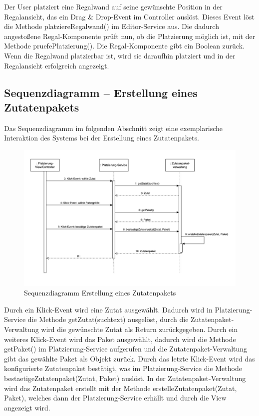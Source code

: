 Der User platziert eine Regalwand auf seine gewünschte Position in der Regalansicht, das ein Drag \& Drop-Event im
Controller auslöst. Dieses Event löst die Methode platziereRegalwand() im Editor-Service aus. Die dadurch angestoßene
Regal-Komponente prüft nun, ob die Platzierung möglich ist, mit der Methode pruefePlatzierung(). Die Regal-Komponente
gibt ein Boolean zurück. Wenn die Regalwand platzierbar ist, wird sie daraufhin platziert und in der Regalansicht
erfolgreich angezeigt.

\subsection{Sequenzdiagramm – Erstellung eines Zutatenpakets}
Das Sequenzdiagramm im folgenden Abschnitt zeigt eine exemplarische Interaktion des Systems bei der Erstellung eines Zutatenpakets.

\begin{figure}[H]
    \centering
    \includegraphics[width=1\textwidth]{Bilder/Kapitel/Laufzeitsicht/Sequenzdiagramm_Zutatenpaket-Erstellung}
    \caption{Sequenzdiagramm Erstellung eines Zutatenpakets}
    \label{fig:Sequenzdiagramm_Erstellung_Zutatenpaket}
\end{figure}

Durch ein Klick-Event wird eine Zutat ausgewählt. Dadurch wird in Platzierung-Service die Methode getZutat(suchtext)
ausgelöst, durch die Zutatenpaket-Verwaltung wird die gewünschte Zutat als Return zurückgegeben. Durch ein weiteres
Klick-Event wird das Paket ausgewählt, dadurch wird die Methode getPaket() im Platzierung-Service aufgerufen und die
Zutatenpaket-Verwaltung gibt das gewählte Paket als Objekt zurück. Durch das letzte Klick-Event wird das konfigurierte
Zutatenpaket bestätigt, was im Platzierung-Service die Methode bestaetigeZutatenpaket(Zutat, Paket) auslöst. In der
Zutatenpaket-Verwaltung wird das Zutatenpaket erstellt mit der Methode erstelleZutatenpaket(Zutat, Paket), welches
dann der Platzierung-Service erhällt und durch die View angezeigt wird.

